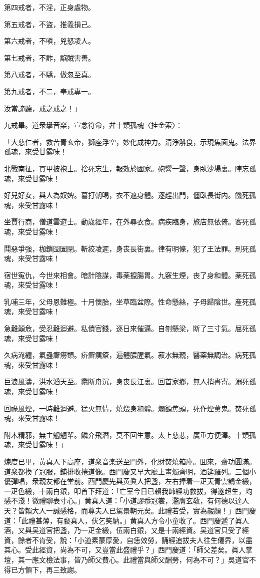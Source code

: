 第四戒者，不淫，正身處物。

第五戒者，不盜，推義損己。

第六戒者，不嗔，兇怒凌人。

第七戒者，不詐，諂賊害善。

第八戒者，不驕，傲忽至真。

第九戒者，不二，奉戒專一。

汝當諦聽，戒之戒之！」

九戒畢。道衆擧音楽，宣念符命，幷十類孤魂〈挂金索〉：

「大慈仁者，救苦青玄帝，獅座浮空，妙化成神力。清淨斛食，示現焦面鬼。法界孤魂，來受甘露味！　

北戰南征，貫甲披袍士。捨死忘生，報效於國家。砲響一聲，身臥沙場裏。陣忘孤魂，來受甘露味！

好兒好女，與人為奴婢。暮打朝喝，衣不遮身體。逐趕出門，僵臥長街内。饑死孤魂，來受甘露味！

坐賈行商，僧道雲遊士。動歲經年，在外尋衣食。病疾臨身，旅店無依倚。客死孤魂，來受甘露味！

鬦惡爭強，枷鎖囹圄閉。斬絞凌遲，身丧長街裏。律有明條，犯了王法罪。刑死孤魂，來受甘露味！

宿世寃仇，今世來相會。暗計陰謀，毒薬攛腸胃。九竅生煙，丧了身和體。薬死孤魂，來受甘露味！

乳哺三年，父母恩難極。十月懷胎，坐草臨盆際。性命懸絲，子母歸陰世。産死孤魂，來受甘露味！

急難顛危，受忍難迴避。私債官錢，逐日來催逼。自刎懸梁，断了三寸氣。屈死孤魂，來受甘露味！

久病淹纏，氣蠱癱癆類。疥癬痍瘡，遍體膿腥氣。菽水無親，醫薬無調治。病死孤魂，來受甘露味！

巨浪風濤，洪水滔天至。纜断舟沉，身丧長江裏。回首家鄉，無人捎書寄。溺死孤魂，來受甘露味！

回祿風煙，一時難迴避。猛火無情，燒燬身和體。爛額焦頭，死作煙薰鬼。焚死孤魂，來受甘露味！

附木精邪，無主魍魎輩。鱗介飛潛，莫不回生意。太上慈悲，廣垂方便澤。十類孤魂，來受甘露味！」

煉度已畢，黃真人下高座，道衆音楽送至門外，化財焚燒箱庫。囬來，齋功圓滿。道衆都換了冠服，鋪排收捲道像。西門慶又早大廳上畫燭齊明，酒筵羅列。三個小優彈唱，衆親友都在堂前。西門慶先與黄眞人把盞，左右捧着一疋天青雲鶴金緞，一疋色緞，十兩白銀，叩首下拜道：「亡室今日已賴我師經功救拔，得遂超生，均感不淺！微禮聊表寸心。」黄真人道：「小道謬忝冠裳，濫膺玄敎，有何德以達人天？皆賴大人一誠感格，而尊夫人已駕景朝元矣。此禮若受，實為赧顏！」西門慶道：「此禮甚薄，有褻真人，伏乞笑納。」黄真人方令小童收了。西門慶遞了眞人酒，又與吴道官把盞，乃一疋金緞，伍兩白銀，又是十兩經資。吴道官只受了經資，餘者不肯受，說：「小道素蒙厚愛，自恁效勞，誦經追拔夫人往生僊界，以盡其心。受此經資，尚為不可，又豈當此盛禮乎？」西門慶道：「師父差矣。眞人掌壇，其一應文檢法事，皆乃師父費心。此禮當與師父酬勞，何為不可？」吳道官不得已方領下，再三致謝。

